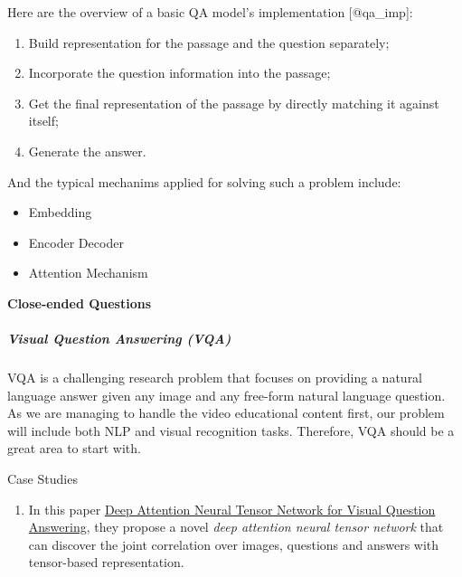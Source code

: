 \documentclass{acm_proc_article-sp}
\renewcommand{\paragraph}[1]{\vskip 6pt\noindent\textbf{#1 }}
\providecommand{\tightlist}{%
  \setlength{\itemsep}{0pt}\setlength{\parskip}{0pt}}
\begin{document}
Here are the overview of a basic QA model's implementation
{[}@qa\_imp{]}:

\begin{enumerate}
\def\labelenumi{\arabic{enumi}.}
\item
  Build representation for the passage and the question separately;
\item
  Incorporate the question information into the passage;
\item
  Get the final representation of the passage by directly matching it
  against itself;
\item
  Generate the answer.
\end{enumerate}

And the typical mechanims applied for solving such a problem include:

\begin{itemize}
\item
  Embedding
\item
  Encoder Decoder
\item
  Attention Mechanism
\end{itemize}

\paragraph{Close-ended Questions}\label{close-ended-questions}

\subparagraph{Visual Question Answering
(VQA)}\label{visual-question-answering-vqa}

VQA is a challenging research problem that focuses on providing a
natural language answer given any image and any free-form natural
language question. As we are managing to handle the video educational
content first, our problem will include both NLP and visual recognition
tasks. Therefore, VQA should be a great area to start with.

Case Studies

\begin{enumerate}
\def\labelenumi{\arabic{enumi}.}
\tightlist
\item
  In this paper
  \href{http://openaccess.thecvf.com/content_ECCV_2018/papers/Yalong_Bai_Deep_Attention_Neural_ECCV_2018_paper.pdf}{Deep
  Attention Neural Tensor Network for Visual Question Answering}, they
  propose a novel \emph{deep attention neural tensor network} that can
  discover the joint correlation over images, questions and answers with
  tensor-based representation.
\end{enumerate}
\end{document}
